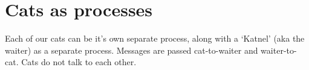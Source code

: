 \section{Cats as processes}
Each of our cats can be it's own separate process, along with a `Katnel' (aka the waiter) as a separate process.
Messages are passed cat-to-waiter and waiter-to-cat. Cats do not talk to each other.

